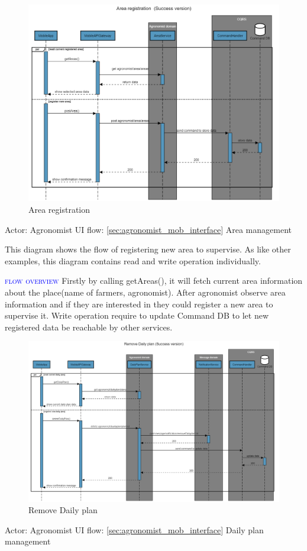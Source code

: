 \newpage
\begin{figure}[H]
	\centering
    \includegraphics[width=\textwidth]{Images/sequence-diagram/area-registration.png}
	\caption{\label{fig:se_area}Area registration}
\end{figure}
Actor: Agronomist
\newline
UI flow: {\ref{sec:agronomist_mob_interface} Area management}

This diagram shows the flow of registering new area to supervise. As like other examples, this diagram contains read and write operation individually.

\textsc{\textcolor{blue}{flow overview}}
\newline
Firstly by calling getAreas(), it will fetch current area information about the place(name of farmers, agronomist). After agronomist observe area information and if they are interested in they could register a new area to supervise it. Write operation require to update Command DB to let new registered data be reachable by other services.

\newpage
\begin{figure}[H]
	\centering
    \includegraphics[width=\textwidth]{Images/sequence-diagram/daily-plan.png}
	\caption{\label{fig:se_daily}Remove Daily plan}
\end{figure}
Actor: Agronomist
\newline
UI flow: {\ref{sec:agronomist_mob_interface} Daily plan management}

